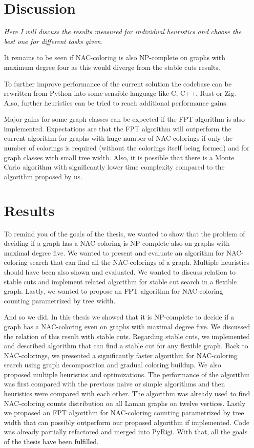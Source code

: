 
\chapter{Discussion}

\emph{Here I will discuss the results measured for individual heuristics
	and choose the best one for different tasks given.}

It remains to be seen if NAC-coloring is also NP-complete on graphs with
maximum degree four as this would diverge from the stable cuts results.

To further improve performance of the current solution the codebase
can be rewritten from Python into some sensible language like C, C++, Rust or Zig.
Also, further heuristics can be tried to reach additional performance  gains.

Major gains for some graph classes
can be expected if the FPT algorithm is also implemented.
Expectations are that the FPT algorithm will outperform the current algorithm
for graphs with huge number of NAC-colorings if only the number of colorings
is required (without the colorings itself being formed) and
for graph classes with small tree width.
Also, it is possible that there is a Monte Carlo algorithm with significantly
lower time complexity compared to the algorithm proposed by us.

\chapter{Results}

To remind you of the goals of the thesis,
we wanted to show that the problem of deciding if a graph has a NAC-coloring
is NP-complete also on graphs with maximal degree five.
We wanted to present and evaluate an algorithm for NAC-coloring search
that can find all the NAC-colorings of a graph.
Multiple heuristics should have been also shown and evaluated.
We wanted to discuss relation to stable cuts and implement related algorithm
for stable cut search in a flexible graph.
Lastly, we wanted to propose an FPT algorithm for NAC-coloring counting
parametrized by tree width.

And so we did.
In this thesis we showed that it is NP-complete
to decide if a graph has a NAC-coloring even on graphs with maximal degree five.
We discussed the relation of this result with stable cuts.
Regarding stable cuts, we implemented and described algorithm that can find
a stable cut for any flexible graph.
Back to NAC-colorings, we presented a significantly faster algorithm
for NAC-coloring search using graph decomposition and gradual coloring buildup.
We also proposed multiple heuristics and optimizations.
The performance of the algorithm was
first compared with the previous naive or simple
algorithms and then heuristics were compared with each other.
The algorithm was already used to find NAC-coloring counts distribution
on all Laman graphs on twelve vertices.
Lastly we proposed an FPT algorithm for NAC-coloring counting
parametrized by tree width that can
possibly outperform our proposed algorithm if implemented.
Code was already partially refactored and merged into PyRigi.
With that, all the goals of the thesis have been fulfilled.

